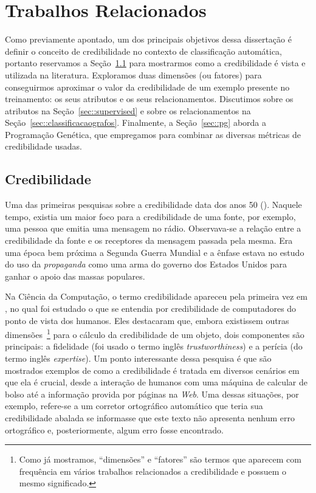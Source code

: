 
\chapter{Trabalhos Relacionados}
\label{cap::related}

Como previamente apontado, um dos principais objetivos dessa dissertação é definir o conceito de credibilidade no contexto de classificação automática, portanto reservamos a
Seção~\ref{sec::credibilidade} para mostrarmos como a credibilidade é vista e utilizada na literatura.
Exploramos duas dimensões (ou fatores) para conseguirmos aproximar o valor da credibilidade de um exemplo presente no treinamento: os seus atributos e os seus relacionamentos.
Discutimos sobre os atributos na Seção~\ref{sec::supervised} e sobre os relacionamentos na Seção~\ref{sec::classificacaografos}.
Finalmente, a Seção~\ref{sec::pg} aborda a Programação Genética, que empregamos para combinar as diversas métricas de credibilidade usadas.


\section{Credibilidade}
\label{sec::credibilidade}

Uma das primeiras pesquisas sobre a credibilidade data dos anos 50 (\cite{Hovland51}). Naquele tempo, existia um maior foco para a credibilidade de uma fonte, por exemplo, uma pessoa que emitia uma mensagem no rádio. Observava-se a relação entre a credibilidade da fonte e os receptores da mensagem passada pela mesma. Era uma época bem próxima a Segunda Guerra Mundial e a ênfase estava no estudo do uso da \textit{propaganda} como uma arma do governo dos Estados Unidos para ganhar o apoio das massas populares.

Na Ciência da Computação, o termo credibilidade apareceu pela primeira vez em \cite{Tseng99}, no qual foi estudado o
que se entendia por credibilidade de computadores do ponto de vista dos humanos.
Eles destacaram que, embora existissem outras dimensões~\footnote{Como já mostramos, ``dimensões'' e ``fatores'' são termos que aparecem com frequência em vários trabalhos relacionados a credibilidade e possuem o mesmo significado.} para o cálculo da credibilidade de um objeto, dois componentes são principais: a fidelidade (foi usado o termo inglês \textit{trustworthiness}) e a perícia (do termo inglês \textit{expertise}).
Um ponto interessante dessa pesquisa é que são mostrados exemplos de como a credibilidade é tratada em diversos cenários em que ela é crucial, desde a interação de humanos com uma máquina de calcular de bolso até a informação provida por páginas na \textit{Web}.
Uma dessas situações, por exemplo, refere-se a um corretor ortográfico automático que teria sua credibilidade abalada se informasse que este texto não apresenta nenhum erro ortográfico e, posteriormente, algum erro fosse encontrado.

